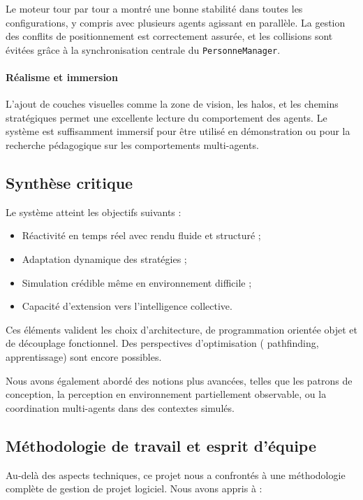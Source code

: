 Le moteur tour par tour a montré une bonne stabilité dans toutes les configurations, y compris avec plusieurs agents agissant en parallèle. La gestion des conflits de positionnement est correctement assurée, et les collisions sont évitées grâce à la synchronisation centrale du \texttt{PersonneManager}.

\paragraph{Réalisme et immersion}

L’ajout de couches visuelles comme la zone de vision, les halos, et les chemins stratégiques permet une excellente lecture du comportement des agents. Le système est suffisamment immersif pour être utilisé en démonstration ou pour la recherche pédagogique sur les comportements multi-agents.

\subsection{Synthèse critique}

Le système atteint les objectifs suivants :
\begin{itemize}
    \item Réactivité en temps réel avec rendu fluide et structuré ;
    \item Adaptation dynamique des stratégies ;
    \item Simulation crédible même en environnement difficile ;
    \item Capacité d’extension vers l’intelligence collective.
\end{itemize}

Ces éléments valident les choix d’architecture, de programmation orientée objet et de découplage fonctionnel. Des perspectives d’optimisation ( pathfinding, apprentissage) sont encore possibles.


Nous avons également abordé des notions plus avancées, telles que les patrons de conception, la perception en environnement partiellement observable, ou la coordination multi-agents dans des contextes simulés.

\subsection{Méthodologie de travail et esprit d’équipe}

Au-delà des aspects techniques, ce projet nous a confrontés à une méthodologie complète de gestion de projet logiciel. Nous avons appris à :

